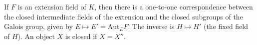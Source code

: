 If $F$ is an extension field of $K$, then there is a one-to-one correspondence between the closed intermediate fields of the extension and the closed subgroups of the Galois group, given by $E \mapsto E' = \mathrm{Aut}_E F$. The inverse is $H \mapsto H'$ (the fixed field of $H$). An object $X$ is closed if $X = X''$.
